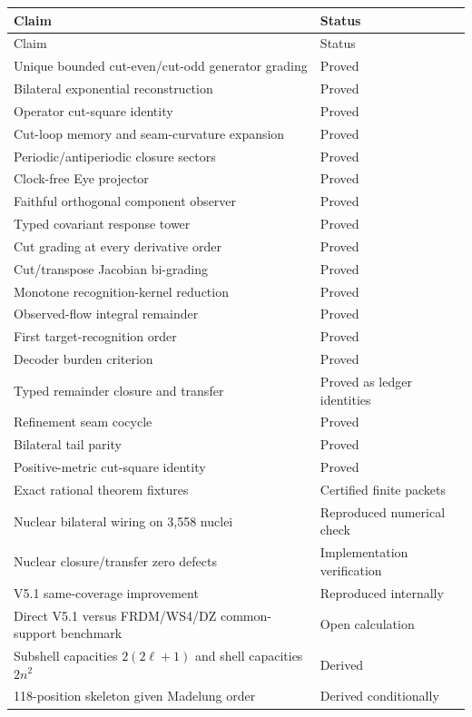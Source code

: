 \begin{longtable}{p{}>{\raggedright\arraybackslash}p{}}
\toprule
Claim & Status\\
\midrule
\endfirsthead
\toprule
Claim & Status\\
\midrule
\endhead
Unique bounded cut-even/cut-odd generator grading & Proved\\
Bilateral exponential reconstruction & Proved\\
Operator cut-square identity & Proved\\
Cut-loop memory and seam-curvature expansion & Proved\\
Periodic/antiperiodic closure sectors & Proved\\
Clock-free Eye projector & Proved\\
Faithful orthogonal component observer & Proved\\
Typed covariant response tower & Proved\\
Cut grading at every derivative order & Proved\\
Cut/transpose Jacobian bi-grading & Proved\\
Monotone recognition-kernel reduction & Proved\\
Observed-flow integral remainder & Proved\\
First target-recognition order & Proved\\
Decoder burden criterion & Proved\\
Typed remainder closure and transfer & Proved as ledger identities\\
Refinement seam cocycle & Proved\\
Bilateral tail parity & Proved\\
Positive-metric cut-square identity & Proved\\
Exact rational theorem fixtures & Certified finite packets\\
Nuclear bilateral wiring on 3,558 nuclei & Reproduced numerical check\\
Nuclear closure/transfer zero defects & Implementation verification\\
V5.1 same-coverage improvement & Reproduced internally\\
Direct V5.1 versus FRDM/WS4/DZ common-support benchmark & Open calculation\\
Subshell capacities $2(2\ell+1)$ and shell capacities $2n^2$ & Derived\\
118-position skeleton given Madelung order & Derived conditionally\\

\end{longtable}
